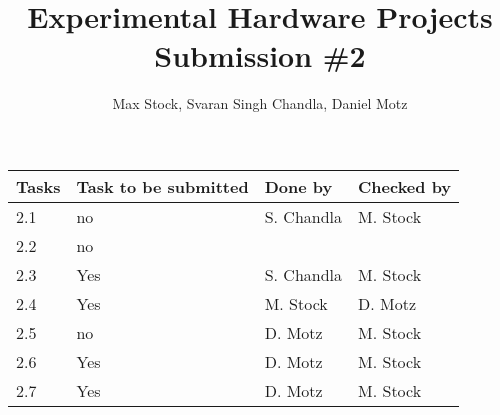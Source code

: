 \documentclass[runningheads]{llncs}
\begin{document}
\newcommand{\hanr}{2}
%
\title{Experimental Hardware Projects Submission \#\hanr}
%
\author{Max Stock, Svaran Singh Chandla, Daniel Motz}
%
%
%
\maketitle
%
%
{\def\arraystretch{2}\tabcolsep=10pt
\begin{tabular}{@{}l | l | l | l @{}}
    Tasks & Task to be submitted & Done by & Checked by \\
    \hline
    2.1 & no  &  S. Chandla & M. Stock \\
    2.2 & no  & \\
    2.3 & Yes & S. Chandla & M. Stock \\
    2.4 & Yes & M. Stock   & D. Motz \\
    2.5 & no  & D. Motz    & M. Stock \\
    2.6 & Yes & D. Motz    & M. Stock \\
    2.7 & Yes & D. Motz    & M. Stock \\
\end{tabular}%
}
%
\end{document}
